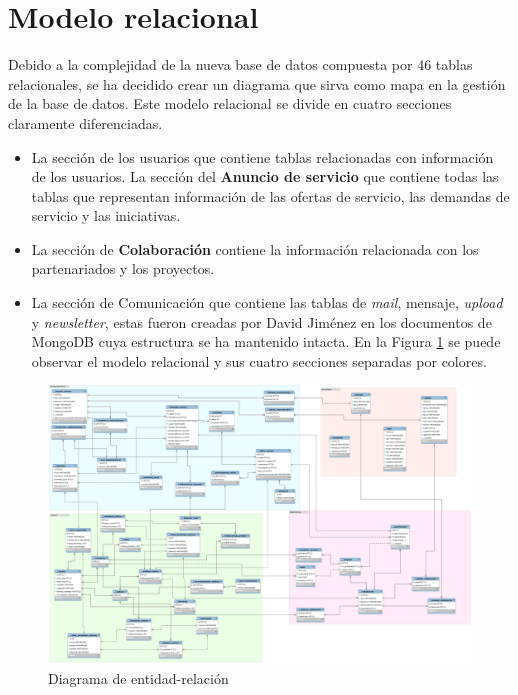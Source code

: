 \documentclass[11pt]{book}
\begin{document}
	\section{Modelo relacional}
	Debido a la complejidad de la nueva base de datos compuesta por 46 tablas relacionales, se ha decidido crear un diagrama que sirva como mapa en la gestión de la base de datos. Este modelo relacional se divide en cuatro secciones claramente diferenciadas.
	\begin{itemize} 
		\item La sección de los usuarios que contiene tablas relacionadas con información de los usuarios. La sección del \textbf{Anuncio de servicio} que contiene todas las tablas que representan información de las ofertas de servicio, las demandas de servicio y las iniciativas.
		\item La sección de \textbf{Colaboración} contiene la información relacionada con los partenariados y los proyectos.
		\item La sección de Comunicación que contiene las tablas de \textit{mail}, mensaje, \textit{upload} y \textit{newsletter}, estas fueron creadas por David Jiménez en los documentos de MongoDB cuya estructura se ha mantenido intacta.
		En la Figura \ref{fig:relacional} se puede observar el modelo relacional y sus cuatro secciones separadas por colores.
	\end{itemize}
	\begin{landscape}
		\begin{figure}[p]
			\centering
			\includegraphics[scale=0.25]{er}
			\caption{Diagrama de entidad-relación}
			\label{fig:relacional}
		\end{figure}
	\end{landscape}
	
\end{document}
